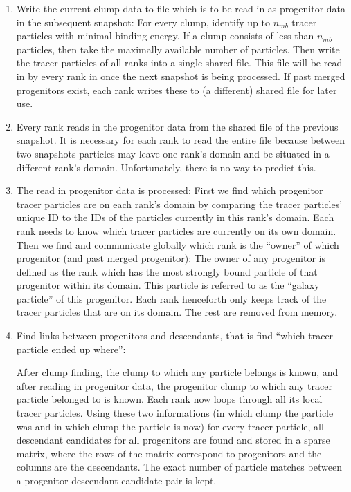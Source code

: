 \begin{enumerate}
%	
	\item Write the current clump data to file which is to be read in as 
		progenitor data in the subsequent snapshot:
		For every clump, identify up to $n_{mb}$ tracer particles with 
		minimal binding energy. If a clump consists of less than $n_{mb}$ 
		particles, then take the maximally available number of particles.
		Then write the tracer particles of all ranks into a single shared 
		file. This file will be read in by every rank in once the next 
		snapshot is being processed. If past merged progenitors exist, 
		each rank writes these to (a different) shared file for later use.
%	
	\item Every rank reads in the progenitor data from the shared file 
		of the previous snapshot. It is necessary for each rank to read
		the entire file because between two snapshots particles may leave 
		one rank's domain and be situated	in a different rank's domain. 
		Unfortunately, there is no way to	predict this. 
	
	\item The read in progenitor data is processed:
		First we find which progenitor tracer particles are on each rank's 
		domain by comparing the tracer particles' unique ID to the IDs of 
		the particles currently in this rank's domain.
		Each rank needs to know which tracer particles are currently on its 
		own domain.	Then we find and communicate globally which rank is the 
		``owner'' of which progenitor (and past merged progenitor): 
		The owner of any progenitor is defined as the rank which has the most 
		strongly bound particle of that progenitor within its domain.
		This particle is referred to as the ``galaxy particle'' of this 
		progenitor. Each rank henceforth only keeps track of the tracer 
		particles that are on its domain. The rest are removed from memory.
	
	\item Find links between progenitors and descendants, that is find 
		``which tracer particle ended up where'':
	
		After clump finding, the clump to which any particle belongs is known, 
		and after reading in progenitor data, the progenitor clump 
		to which any tracer particle belonged to is known.
		Each rank now loops through all its local tracer particles.
		Using these two informations (in which clump the particle was and in 
		which clump the particle is now) for every tracer particle, 
		all descendant candidates for all progenitors are found and stored 
		in a sparse matrix, where the rows of the matrix correspond 
		to progenitors and the columns are the descendants.
		The exact number of particle matches between a progenitor-descendant 
		candidate pair is kept.
		

\end{enumerate}
